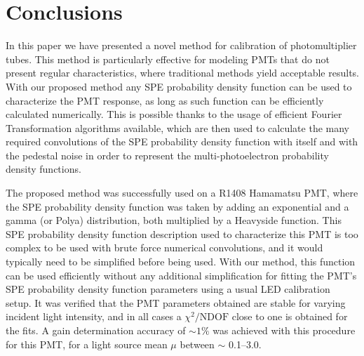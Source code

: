\documentclass[a4paper,11pt]{article}
\begin{document}
%

\section{Conclusions}
\label{sec:last}

\newcommand{\PMT}{PMT}
\newcommand{\SPE}{SPE}
\newcommand{\pdf}{probability density function}

In this paper we have presented a novel method for calibration of photomultiplier tubes.
This method is particularly effective for modeling \PMT{}s that do not present regular characteristics, where traditional methods yield acceptable results.
With our proposed method any \SPE{} \pdf{} can be used to characterize the \PMT{} response, as long as such function can be efficiently calculated numerically.
This is possible thanks to the usage of efficient Fourier Transformation algorithms available, which are then used to calculate the many required convolutions of the \SPE{} \pdf{}
with itself and with the pedestal noise in order to represent the multi-photoelectron \pdf{}s.

The proposed method was successfully used on a R1408 Hamamatsu PMT, where the \SPE{} \pdf{} was taken by adding an exponential and a gamma (or Polya) distribution, both multiplied by a Heavyside function.
This \SPE{} \pdf{} description used to characterize this \PMT{} is too complex to be used with brute force numerical convolutions, and it would typically need to be simplified before being used.
With our method, this function can be used efficiently without any additional simplification for fitting the \PMT{}'s \SPE{} \pdf{} parameters using a usual LED calibration setup.
It was verified that the \PMT{} parameters obtained are stable for varying incident light intensity, and in all cases a $\chi^2/\text{NDOF}$ close to one is obtained for the fits.
A gain determination accuracy of $\sim1\%$ was achieved with this procedure for this \PMT{}, for a light source mean $\mu$ between $\sim$ 0.1--3.0. 

 
\end{document}
